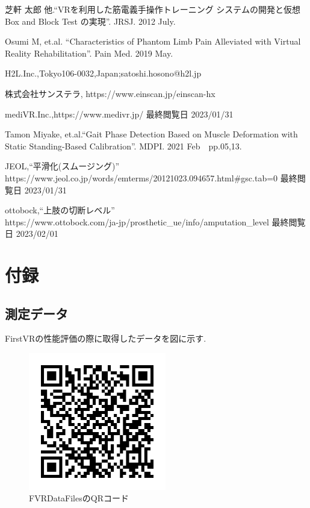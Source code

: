 \documentclass{ltjsreport}
\begin{document}
\begin{thebibliography}{99}

	芝軒 太郎 他.``VRを利用した筋電義手操作トレーニング
	システムの開発と仮想 Box and Block Test の実現''.
	JRSJ. 2012 July.

	Osumi M, et.al.
	``Characteristics of Phantom Limb Pain Alleviated
	with Virtual Reality Rehabilitation''.
	Pain Med. 2019 May.

	H2L.Inc.,Tokyo106-0032,Japan;satoshi.hosono@h2l.jp
	

	株式会社サンステラ, https://www.einscan.jp/einscan-hx
	
	
	
	mediVR.Inc.,https://www.medivr.jp/
	最終閲覧日 2023/01/31

	


	Tamon Miyake, et.al.``Gait Phase Detection Based on Muscle Deformation
	with Static Standing-Based Calibration''.
	MDPI. 2021 Feb　pp.05,13.


	JEOL,``平滑化(スムージング)''\\
	https://www.jeol.co.jp/words/emterms/20121023.094657.html\#gsc.tab=0
	最終閲覧日 2023/01/31

	ottobock,``上肢の切断レベル''\\
	https://www.ottobock.com/ja-jp/prosthetic\_ue/info/amputation\_level
	最終閲覧日 2023/02/01

\end{thebibliography}

\chapter*{付録}

\appendix
\renewcommand{\thesection}{\Alph{chapter}.\arabic{section}}
\setcounter{chapter}{1}

\section{測定データ}
	FirstVRの性能評価の際に取得したデータを図に示す.
	\begin{figure}[H]
	\centering
	\includegraphics[width = 6cm]{../figs/QRshare.png}
	\caption{FVRDataFilesのQRコード}
	\label{fig:QRcode}
	\end{figure}
	\vspace{-15pt}
	
\end{document}
